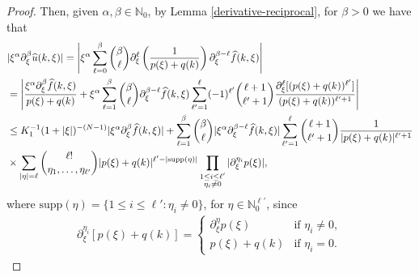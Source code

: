 \documentclass[11pt,reqno]{amsart}
\numberwithin{equation}{section}
\theoremstyle{definition}
\theoremstyle{definition}
\newcommand{\supp}{\text{supp}}
\newcommand{\N}{\mathbb{N}}
\begin{document}
\begin{proof}
    
    Then, given $\alpha,\beta\in\N_0$,  by Lemma \ref{derivative-reciprocal}, for $\beta>0$ we have that 
\begin{align}
        & |\xi^\alpha\partial_\xi^\beta\widehat{u}(k,\xi)| =\left|\xi^\alpha\sum_{\ell=0}^\beta \binom{\beta}{\ell}\partial_\xi^{\ell}\left(\frac{1}{p(\xi)+q(k)}\right)\partial_\xi^{\beta-\ell}\widehat{f}(k,\xi)\right|\notag \\
        &=\left| \frac{\xi^\alpha\partial_\xi^\beta\widehat{f}(k,\xi)}{p(\xi)+q(k)}+\xi^\alpha\sum_{\ell=1}^\beta \binom{\beta}{\ell}\partial_\xi^{\beta-\ell}\widehat{f}(k,\xi) \sum_{\ell'=1}^{\ell}(-1)^{\ell'}\binom{\ell+1}{\ell'+1}\frac{\partial_\xi^{\ell}[(p(\xi)+q(k))^{\ell'}]}{(p(\xi)+q(k))^{\ell'+1}}\right|\notag\\
        &\leq K_1^{-1}(1+|\xi|)^{-(N-1)}|\xi^\alpha\partial_\xi^\beta\widehat{f}(k,\xi)|+\sum_{\ell=1}^\beta \binom{\beta}{\ell}|\xi^\alpha\partial_\xi^{\beta-\ell}\widehat{f}(k,\xi) |\sum_{\ell'=1}^{\ell}\binom{\ell+1}{\ell'+1}\frac{1}{|p(\xi)+q(k)|^{\ell'+1}}\notag\\
        &\times\sum_{\substack{|\eta|=\ell}}\binom{\ell!}{\eta_1,\dots,\eta_{\ell'}} |p(\xi)+q(k)|^{\ell'-|\supp(\eta)|}\prod_{\substack{1\leq i\leq \ell'\\\eta_i\neq 0 }}|\partial_\xi^{\eta_i}p(\xi)|,\label{ineq_u_cte}
        \end{align}
where $\supp(\eta)=\{1\leq i\leq \ell':\eta_i\neq 0\}$, for $\eta\in\N_0^{\ell'}$, since 
\begin{align*}
    \partial_\xi^{\eta_i} [p(\xi)+q(k)]=\begin{cases}
        \partial_\xi^\eta p(\xi)&\text{if }\eta_i\neq 0,\\
        p(\xi)+q(k)&\text{if }\eta_i=0.
    \end{cases}
\end{align*}


\end{proof}
\end{document}
